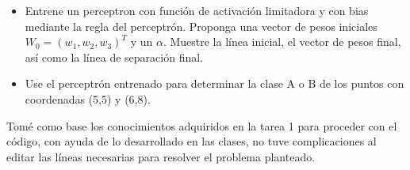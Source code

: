 \begin{itemize}
    \item Entrene un perceptron con función de activación limitadora y con bias mediante la regla del perceptrón. Proponga una vector de pesos iniciales $W_0=(w_1,w_2,w_3 )^T$ y un $\alpha$. Muestre la línea inicial, el vector de pesos final, así como la línea de separación final.
	\item Use el perceptrón entrenado para determinar la clase A o B de los puntos con coordenadas (5,5) y (6,8).
\end{itemize}

Tomé como base los conocimientos adquiridos en la tarea 1 para proceder con el código, con ayuda de
lo desarrollado en las clases, no tuve complicaciones al editar las líneas necesarias para resolver el 
problema planteado.

